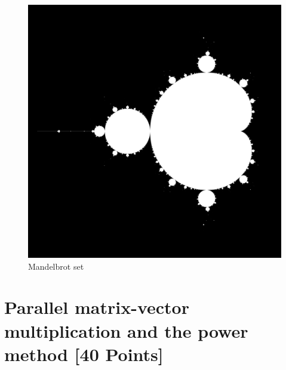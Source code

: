 \documentclass[unicode,11pt,a4paper,oneside,numbers=endperiod,openany]{scrartcl}
\begin{document}
\begin{figure}
      \centering
      \centering
      \includegraphics[width=.5\linewidth]{plots/mandel.png}
      \caption{Mandelbrot set}
      \label{fig:mandelbrot}
\end{figure}


\section{Parallel matrix-vector multiplication and the power method
        [40 Points]}
\end{document}
